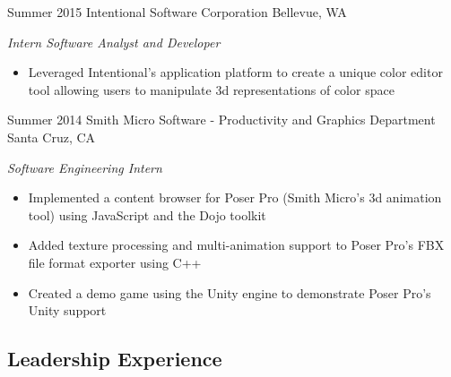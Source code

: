 \documentclass[print]{friggeri-cv} %
\begin{document}
\begin{entrylist}


\entry
{Summer 2015}
{Intentional Software Corporation}
{Bellevue, WA}
{\emph{Intern Software Analyst and Developer}
\begin{itemize}
\item Leveraged Intentional's application platform to create a unique color editor tool allowing users to manipulate 3d representations of color space
\end{itemize}}
\entry
{Summer 2014}
{Smith Micro Software - Productivity and Graphics Department}
{Santa Cruz, CA}
{\emph{Software Engineering Intern}
\begin{itemize}
\item Implemented a content browser for Poser Pro (Smith Micro's 3d animation tool) using JavaScript
and the Dojo toolkit
\item Added texture processing and multi-animation support to Poser Pro's FBX file format exporter using C++
\item Created a demo game using the Unity engine to demonstrate Poser Pro's Unity support
\end{itemize}}


\end{entrylist}

\subsection{Leadership Experience}
\end{document}
